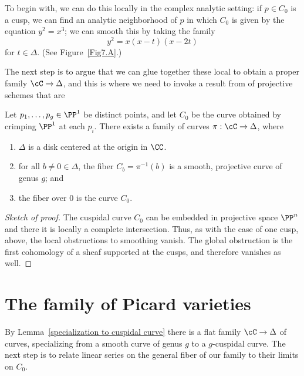 To begin with, we can do this locally in the complex analytic setting:
if $p \in C_0$ is a cusp, we can find an analytic neighborhood of $p$
in which $C_0$ is given by the equation $y^2 = x^3$; we can smooth this
by taking the family
$$
y^2 = x(x-t)(x-2t)
$$
for $t\in \Delta$.
(See Figure~\ref{Fig7.A}.)

The next step is to argue that we can glue together these local 
%
to obtain a proper family $\cC \to \Delta$, and this is where we need
to invoke a result from 
%
of projective schemes that
are 
%

\begin{npt}
\begin{lemma}[{{\cite[Proposition 6.5.2]{MR2223408}}}]
\label{specialization to cuspidal curve}
Let 
$p_1,\dots,p_g\in \PP^{1}$ be distinct points, 
and let $C_0$ be
the curve
obtained by
crimping $\PP^1$ at each $p_i$. There exists a family of curves $\pi :
\cC \to \Delta$, where
\begin{enumerate}
\item $\Delta$ is a disk centered at the origin in $\CC$.
\item for all $b \neq 0 \in \Delta$, the fiber $C_b = \pi^{-1}(b)$
is a smooth, projective curve of genus $g$;  and
\item the fiber over $0$ is the curve $C_0$.
\unif
\end{enumerate}
\end{lemma}
\end{npt}

\begin{proof}[Sketch of proof]
The cuspidal curve $C_{0}$ can be embedded in projective space $\PP^{n}$
and there
it is locally a complete intersection.
Thus,
as with the case of one cusp,
above, the local obstructions
to smoothing vanish. The global obstruction is the first cohomology of
a sheaf supported at the cusps,
and therefore vanishes as well.
\end{proof}

\section{The family of Picard varieties}\label{Picard family}

By Lemma~\ref{specialization to cuspidal curve} there is a flat family
$\cC \to \Delta$ of curves, specializing from a smooth curve of genus
$g$ to a $g$-cuspidal curve. The next step is to relate linear series
on the general fiber of our family to their limits on $C_0$.

